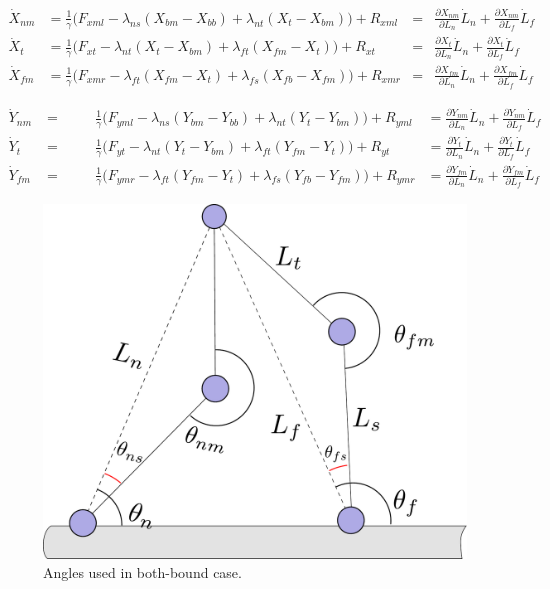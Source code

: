 \documentclass[11pt,twocolumn]{article}
\begin{document}
\begin{align}
  \dot{X}_{nm} &= \frac{1}{\gamma} \Big(F_{xml} - \lambda_{ns}(X_{bm} - X_{bb})
  + \lambda_{nt}(X_{t } - X_{bm}) \Big) + R_{xml}
  &=& \frac{\partial X_{nm}}{\partial L_n}\dot{L}_n + \frac{\partial X_{nm}}{\partial L_f}\dot{L}_f\\
  \dot{X}_{t } &= \frac{1}{\gamma} \Big(F_{xt } - \lambda_{nt}(X_{t } - X_{bm})
  + \lambda_{ft}(X_{fm} - X_{t }) \Big) + R_{xt }
  &=& \frac{\partial X_{t}}{\partial L_n}\dot{L}_n + \frac{\partial X_{t}}{\partial L_f}\dot{L}_f\\
  \dot{X}_{fm} &= \frac{1}{\gamma} \Big(F_{xmr} - \lambda_{ft}(X_{fm} - X_{t })
  + \lambda_{fs}(X_{fb} - X_{fm}) \Big) + R_{xmr}
  &=& \frac{\partial X_{fm}}{\partial L_n}\dot{L}_n + \frac{\partial X_{fm}}{\partial L_f}\dot{L}_f
\end{align}

\begin{align}
  \dot{Y}_{nm} &= \hspace{1cm} \frac{1}{\gamma} \Big(F_{yml} - \lambda_{ns}(Y_{bm} - Y_{bb})
  + \lambda_{nt}(Y_{t } - Y_{bm}) \Big) + R_{yml}
  &= \frac{\partial Y_{nm}}{\partial L_n}\dot{L}_n + \frac{\partial Y_{nm}}{\partial L_f}\dot{L}_f\\
  \dot{Y}_{t}  &= \hspace{1cm} \frac{1}{\gamma} \Big(F_{yt } - \lambda_{nt}(Y_{t } - Y_{bm})
  + \lambda_{ft}(Y_{fm} - Y_{t }) \Big) + R_{yt }
  &= \frac{\partial Y_{t}}{\partial L_n}\dot{L}_n + \frac{\partial Y_{t}}{\partial L_f}\dot{L}_f\\
  \dot{Y}_{fm} &= \hspace{1cm} \frac{1}{\gamma} \Big(F_{ymr} - \lambda_{ft}(Y_{fm} - Y_{t })
  + \lambda_{fs}(Y_{fb} - Y_{fm}) \Big) + R_{ymr}
  &= \frac{\partial Y_{fm}}{\partial L_n}\dot{L}_n + \frac{\partial Y_{fm}}{\partial L_f}\dot{L}_f
\end{align}

\twocolumn

\begin{figure}
  \includegraphics[width=\columnwidth]{../figures/similar-bothbound}
  \caption{Angles used in both-bound case.}\label{fig:similar}
\end{figure}
\end{document}

